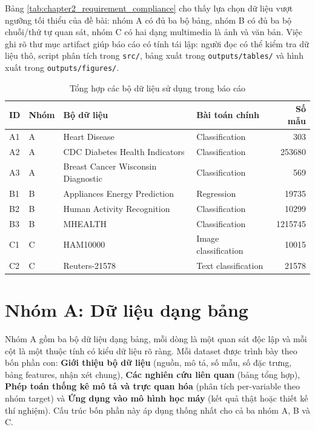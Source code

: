 Bảng \ref{tab:chapter2_requirement_compliance} cho thấy lựa chọn dữ liệu vượt ngưỡng tối thiểu của đề bài: nhóm A có đủ ba bộ bảng, nhóm B có đủ ba bộ chuỗi/thứ tự quan sát, nhóm C có hai dạng multimedia là ảnh và văn bản. Việc ghi rõ thư mục artifact giúp báo cáo có tính tái lập: người đọc có thể kiểm tra dữ liệu thô, script phân tích trong \texttt{src/}, bảng xuất trong \texttt{outputs/tables/} và hình xuất trong \texttt{outputs/figures/}.

\begin{table}[H]
\centering
\caption{Tổng hợp các bộ dữ liệu sử dụng trong báo cáo}
\label{tab:dataset_overview}
\small
\begin{tabular}{llllr}
\toprule
ID & Nhóm & Bộ dữ liệu & Bài toán chính & Số mẫu \\
\midrule
A1 & A & Heart Disease & Classification & 303 \\
A2 & A & CDC Diabetes Health Indicators & Classification & 253680 \\
A3 & A & Breast Cancer Wisconsin Diagnostic & Classification & 569 \\
B1 & B & Appliances Energy Prediction & Regression & 19735 \\
B2 & B & Human Activity Recognition & Classification & 10299 \\
B3 & B & MHEALTH & Classification & 1215745 \\
C1 & C & HAM10000 & Image classification & 10015 \\
C2 & C & Reuters-21578 & Text classification & 21578 \\
\bottomrule
\end{tabular}
\end{table}


\section{Nhóm A: Dữ liệu dạng bảng}

Nhóm A gồm ba bộ dữ liệu dạng bảng, mỗi dòng là một quan sát độc lập và mỗi cột là một thuộc tính có kiểu dữ liệu rõ ràng. Mỗi dataset được trình bày theo bốn phần con: \textbf{Giới thiệu bộ dữ liệu} (nguồn, mô tả, số mẫu, số đặc trưng, bảng features, nhận xét chung), \textbf{Các nghiên cứu liên quan} (bảng tổng hợp), \textbf{Phép toán thống kê mô tả và trực quan hóa} (phân tích per-variable theo nhóm target) và \textbf{Ứng dụng vào mô hình học máy} (kết quả thật hoặc thiết kế thí nghiệm). Cấu trúc bốn phần này áp dụng thống nhất cho cả ba nhóm A, B và C.


